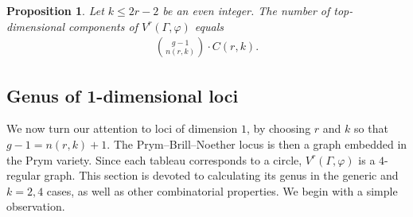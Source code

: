 \documentclass[11pt,reqno]{amsart}
\newcommand{\yoav}[1]{{\color{blue} \sf  Yo$\alpha$v: [#1]}}
\theoremstyle{definition}
\theoremstyle{problem}
\theoremstyle{plain}
\newtheorem{proposition}[definition]{Proposition}
\theoremstyle{remark}
\theoremstyle{theorem}
\numberwithin{equation}{section}
\numberwithin{figure}{section}
\begin{document}
\begin{proposition}
  \label{prop:numcomp}
  Let $k\leq 2r-2$ be an even integer. The number of top-dimensional components of $V^r(\Gamma,\varphi)$ equals 
  \begin{gather*}
  \binom{g-1}{n(r,k)}\cdot C(r,k).
  \end{gather*}
\end{proposition}

% 
  
%
%
%


\subsection{Genus of 1-dimensional loci} %
We now turn our attention to loci of dimension $1$, by choosing $r$ and $k$ so that  $g-1=n(r,k)+1$. The Prym--Brill--Noether locus is then a graph embedded in the Prym variety.  Since each tableau corresponds to a circle, $V^r(\Gamma,\varphi)$ is a $4$-regular graph. This section is devoted to calculating its genus  in the generic and $k=2,4$ cases, as well as other combinatorial properties. We begin with a simple observation.
\end{document}
